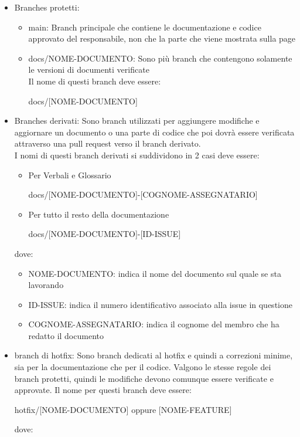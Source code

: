        \begin{itemize}
            \item Branches protetti: 
            \begin{itemize}
                \item main: Branch principale che contiene le documentazione e codice approvato del responsabile, non che la parte che viene mostrata sulla page
                \item docs/NOME-DOCUMENTO: Sono più branch che contengono solamente le versioni di documenti verificate\\
                Il nome di questi branch deve essere:
                \begin{center}
                    docs/[NOME-DOCUMENTO]
                \end{center}
            \end{itemize}
            \item Branches derivati: Sono branch utilizzati per aggiungere modifiche e aggiornare un documento o una parte di codice che poi dovrà essere verificata
            attraverso una pull request verso il branch derivato.\\
            I nomi di questi branch derivati si suddividono in 2 casi deve essere:
            \begin{itemize}
                \item Per Verbali e Glossario
                \begin{center}
                    docs/[NOME-DOCUMENTO]-[COGNOME-ASSEGNATARIO]
                \end{center}
                \item Per tutto il resto della documentazione
                \begin{center}
                    docs/[NOME-DOCUMENTO]-[ID-ISSUE]
                \end{center}
            \end{itemize}
            dove:
    
            \begin{itemize}
                \item NOME-DOCUMENTO: indica il nome del documento sul quale se sta lavorando
                \item ID-ISSUE: indica il numero identificativo associato alla issue in questione
                \item COGNOME-ASSEGNATARIO: indica il cognome del membro che ha redatto il documento
            \end{itemize}
            \item branch di hotfix: Sono branch dedicati al hotfix e quindi a correzioni minime, sia per la documentazione che per il codice. Valgono le stesse regole dei
            branch protetti, quindi le modifiche devono comunque essere verificate e approvate.
            Il nome per questi branch deve essere:
            \begin{center}
                hotfix/[NOME-DOCUMENTO] oppure [NOME-FEATURE]
            \end{center}
            dove:


\end{itemize}
